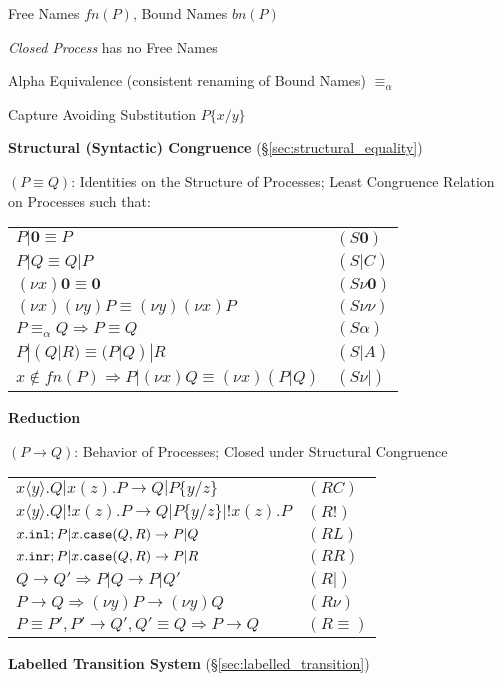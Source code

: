Free Names $fn(P)$, Bound Names $bn(P)$

\emph{Closed Process} has no Free Names

Alpha Equivalence (consistent renaming of Bound Names) $\equiv_\alpha$

Capture Avoiding Substitution $P\{x/y\}$


\textbf{Structural (Syntactic) Congruence}
(\S\ref{sec:structural_equality})

$(P \equiv Q)$: Identities on the Structure of Processes; Least
Congruence Relation on Processes such that:

\begin{tabular}{l l}
  $P|\mathbf{0} \equiv P$ & $(S\mathbf{0})$ \\
  $P|Q \equiv Q|P$ & $(S|C)$ \\
  $(\nu x) \mathbf{0} \equiv \mathbf{0}$ & $(S \nu \mathbf{0})$ \\
  $(\nu x)(\nu y)P \equiv (\nu y)(\nu x)P$ & $(S\nu\nu)$ \\
  $P \equiv_\alpha Q \Rightarrow P \equiv Q$ & $(S\alpha)$ \\
  $P|(Q|R) \equiv (P|Q)|R$ & $(S|A)$ \\
  $x \notin fn(P) \Rightarrow P|(\nu x)Q \equiv (\nu x)(P|Q)$
  & $(S\nu|)$
\end{tabular}


\textbf{Reduction}

$(P \rightarrow Q)$: Behavior of Processes; Closed under Structural
Congruence

\begin{tabular}{l l}
  $x\langle y \rangle.Q | x(z).P \rightarrow Q | P \{y/z\}$
  & $(RC)$ \\
  $x\langle y \rangle.Q | !x(z).P \rightarrow Q | P \{y/z\} | !x(z).P$
  & $(R!)$ \\
  $x.\mathtt{inl}; P | x.\mathtt{case}(Q,R) \rightarrow P | Q$
  & $(RL)$ \\
  $x.\mathtt{inr}; P | x.\mathtt{case}(Q,R) \rightarrow P | R$
  & $(RR)$ \\
  $Q \rightarrow Q' \Rightarrow P|Q \rightarrow P|Q'$
  & $(R|)$ \\
  $P \rightarrow Q \Rightarrow (\nu y)P \rightarrow (\nu y)Q$
  & $(R\nu)$ \\
  $P \equiv P', P' \rightarrow Q', Q'
    \equiv Q \Rightarrow P \rightarrow Q$
  & $(R\equiv)$
\end{tabular}


\textbf{Labelled Transition System}
(\S\ref{sec:labelled_transition})

